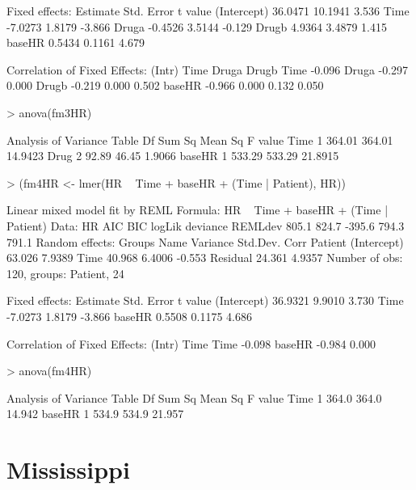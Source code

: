 \documentclass[12pt]{article}
\begin{document}
\begin{Schunk}
\begin{Soutput}
Fixed effects:
            Estimate Std. Error t value
(Intercept)  36.0471    10.1941   3.536
Time         -7.0273     1.8179  -3.866
Druga        -0.4526     3.5144  -0.129
Drugb         4.9364     3.4879   1.415
baseHR        0.5434     0.1161   4.679

Correlation of Fixed Effects:
       (Intr) Time   Druga  Drugb 
Time   -0.096                     
Druga  -0.297  0.000              
Drugb  -0.219  0.000  0.502       
baseHR -0.966  0.000  0.132  0.050
\end{Soutput}
\begin{Sinput}
> anova(fm3HR)
\end{Sinput}
\begin{Soutput}
Analysis of Variance Table
       Df Sum Sq Mean Sq F value
Time    1 364.01  364.01 14.9423
Drug    2  92.89   46.45  1.9066
baseHR  1 533.29  533.29 21.8915
\end{Soutput}
\begin{Sinput}
> (fm4HR <- lmer(HR ~ Time + baseHR + (Time | Patient), HR))
\end{Sinput}
\begin{Soutput}
Linear mixed model fit by REML 
Formula: HR ~ Time + baseHR + (Time | Patient) 
   Data: HR 
   AIC   BIC logLik deviance REMLdev
 805.1 824.7 -395.6    794.3   791.1
Random effects:
 Groups   Name        Variance Std.Dev. Corr   
 Patient  (Intercept) 63.026   7.9389          
          Time        40.968   6.4006   -0.553 
 Residual             24.361   4.9357          
Number of obs: 120, groups: Patient, 24

Fixed effects:
            Estimate Std. Error t value
(Intercept)  36.9321     9.9010   3.730
Time         -7.0273     1.8179  -3.866
baseHR        0.5508     0.1175   4.686

Correlation of Fixed Effects:
       (Intr) Time  
Time   -0.098       
baseHR -0.984  0.000
\end{Soutput}
\begin{Sinput}
> anova(fm4HR)
\end{Sinput}
\begin{Soutput}
Analysis of Variance Table
       Df Sum Sq Mean Sq F value
Time    1  364.0   364.0  14.942
baseHR  1  534.9   534.9  21.957
\end{Soutput}
\end{Schunk}


\section{Mississippi}
\label{sec:Mississippi}
\end{document}
